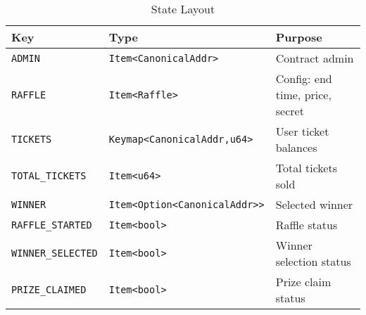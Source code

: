 \documentclass{article}
\begin{document}
\begin{table}[h]
  \centering
  \caption{State Layout}
  \begin{tabular}{@{}lll@{}}
    \toprule
    \textbf{Key} & \textbf{Type} & \textbf{Purpose} \\
    \midrule
    \texttt{ADMIN} & \texttt{Item<CanonicalAddr>} & Contract admin \\
    \texttt{RAFFLE} & \texttt{Item<Raffle>} & Config: end time, price, secret \\
    \texttt{TICKETS} & \texttt{Keymap<CanonicalAddr,u64>} & User ticket balances \\
    \texttt{TOTAL\_TICKETS} & \texttt{Item<u64>} & Total tickets sold \\
    \texttt{WINNER} & \texttt{Item<Option<CanonicalAddr>>} & Selected winner \\
    \texttt{RAFFLE\_STARTED} & \texttt{Item<bool>} & Raffle status \\
    \texttt{WINNER\_SELECTED} & \texttt{Item<bool>} & Winner selection status \\
    \texttt{PRIZE\_CLAIMED} & \texttt{Item<bool>} & Prize claim status \\
    \bottomrule
  \end{tabular}
\end{table}
\end{document}
